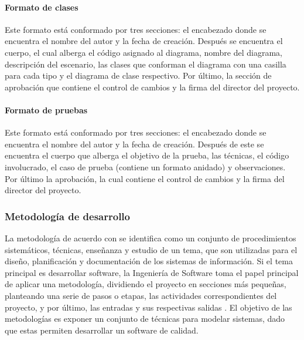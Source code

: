 \paragraph{Formato de clases} Este formato está conformado  por tres secciones: el encabezado donde se encuentra el nombre del autor y la fecha de creación. Después se encuentra el cuerpo, el cual alberga el código asignado al diagrama, nombre del diagrama, descripción del escenario, las clases que conforman el diagrama con una casilla para cada tipo y el diagrama de clase respectivo. Por último, la sección de aprobación que contiene el control de cambios y la firma del director del proyecto.

\paragraph{Formato de pruebas} Este formato está conformado por tres secciones: el encabezado donde se encuentra el nombre del autor y la fecha de creación. Después de este se encuentra el cuerpo que alberga el objetivo de la prueba, las técnicas, el código involucrado, el caso de prueba (contiene un formato anidado) y observaciones. Por último la aprobación, la cual contiene el control de cambios y la firma del director del proyecto.

\subsubsection{Metodología de desarrollo}
La metodología de acuerdo con \textcite{CambridgeDefMethodology} se identifica como un conjunto de procedimientos sistemáticos, técnicas, enseñanza y estudio de un tema, que son utilizadas para el diseño, planificación y documentación de los sistemas de información. Si el tema principal es desarrollar software, la Ingeniería de Software toma el papel principal de aplicar una metodología, dividiendo el proyecto en secciones más pequeñas, planteando una serie de pasos o etapas, las actividades correspondientes del proyecto, y por último, las entradas y sus respectivas salidas \parencite{Sommerville2005}. El objetivo de las metodologías es exponer un conjunto de técnicas para modelar sistemas, dado que estas permiten desarrollar un software de calidad.

